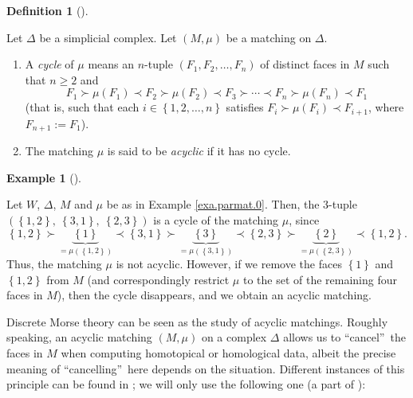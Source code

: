 \documentclass[numbers=enddot,12pt,final,onecolumn,notitlepage]{scrartcl}%
\theoremstyle{definition}
\newtheorem{defi}[theo]{Definition}
\newenvironment{definition}[1][]
{\begin{defi}[#1]\begin{leftbar}}
{\end{leftbar}\end{defi}}
\newtheorem{exam}[theo]{Example}
\newenvironment{example}[1][]
{\begin{exam}[#1]\begin{leftbar}}
{\end{leftbar}\end{exam}}
\begin{document}
\begin{definition}
Let $\Delta$ be a simplicial complex. Let $\left(  M,\mu\right)  $ be a
matching on $\Delta$.

\begin{enumerate}
\item[\textbf{(a)}] A \emph{cycle} of $\mu$ means an $n$-tuple $\left(
F_{1},F_{2},\ldots,F_{n}\right)  $ of distinct faces in $M$ such that $n\geq2$
and%
\[
F_{1}\succ\mu\left(  F_{1}\right)  \prec F_{2}\succ\mu\left(  F_{2}\right)
\prec F_{3}\succ\cdots\prec F_{n}\succ\mu\left(  F_{n}\right)  \prec F_{1}%
\]
(that is, such that each $i\in\left\{  1,2,\ldots,n\right\}  $ satisfies
$F_{i}\succ\mu\left(  F_{i}\right)  \prec F_{i+1}$, where $F_{n+1}:=F_{1}$).

\item[\textbf{(b)}] The matching $\mu$ is said to be \emph{acyclic} if it has
no cycle.
\end{enumerate}
\end{definition}

\begin{example}
Let $W$, $\Delta$, $M$ and $\mu$ be as in Example \ref{exa.parmat.0}. Then,
the $3$-tuple $\left(  \left\{  1,2\right\}  ,\ \left\{  3,1\right\}
,\ \left\{  2,3\right\}  \right)  $ is a cycle of the matching $\mu$, since%
\[
\left\{  1,2\right\}  \succ\underbrace{\left\{  1\right\}  }_{=\mu\left(
\left\{  1,2\right\}  \right)  }\prec\left\{  3,1\right\}  \succ
\underbrace{\left\{  3\right\}  }_{=\mu\left(  \left\{  3,1\right\}  \right)
}\prec\left\{  2,3\right\}  \succ\underbrace{\left\{  2\right\}  }%
_{=\mu\left(  \left\{  2,3\right\}  \right)  }\prec\left\{  1,2\right\}  .
\]
Thus, the matching $\mu$ is not acyclic. However, if we remove the faces
$\left\{  1\right\}  $ and $\left\{  1,2\right\}  $ from $M$ (and
correspondingly restrict $\mu$ to the set of the remaining four faces in $M$),
then the cycle disappears, and we obtain an acyclic matching.
\end{example}

Discrete Morse theory can be seen as the study of acyclic matchings. Roughly
speaking, an acyclic matching $\left(  M,\mu\right)  $ on a complex $\Delta$
allows us to \textquotedblleft cancel\textquotedblright\ the faces in $M$ when
computing homotopical or homological data, albeit the precise meaning of
\textquotedblleft cancelling\textquotedblright\ here depends on the situation.
Different instances of this principle can be found in \cite[Chapters 10, 11,
12, 13]{Kozlov20}; we will only use the following one (a part of \cite[Theorem
10.9]{Kozlov20}):
\end{document}
